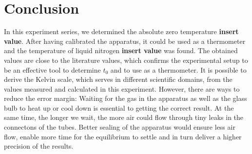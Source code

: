 \section{Conclusion}
    In this experiment series, we determined the absolute zero temperature \textbf{insert value}.
    After having calibrated the apparatus, it could be used as a thermometer and the temperature of liquid nitrogen \textbf{insert value} was found.
    The obtained values are close to the literature values, which confirms the experimental setup to be an effective tool to determine $t_0$ and to use as a thermometer.
    It is possible to derive the Kelvin scale, which serves in different scientific domains, from the values measured and calculated in this experiment.
    However, there are ways to reduce the error margin:
    Waiting for the gas in the apparatus as well as the glass bulb to heat up or cool down is essential to getting the correct result.
    At the same time, the longer we wait, the more air could flow through tiny leaks in the connectons of the tubes.
    Better sealing of the apparatus would ensure less air flow, enable more time for the equilibrium to settle and in turn deliver a higher precision of the results.


